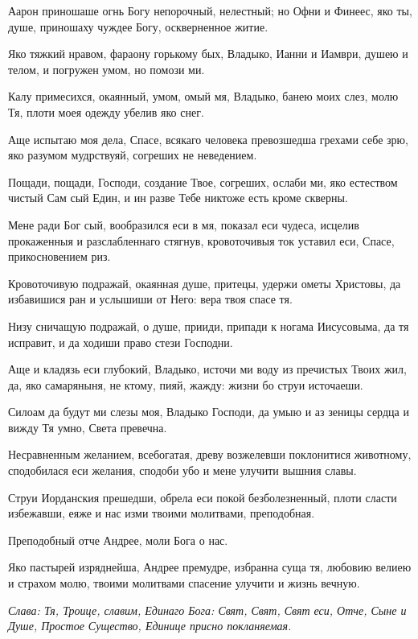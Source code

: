 Аарон приношаше огнь Богу непорочный, нелестный; но Офни и Финеес, яко ты, душе, приношаху чуждее Богу, оскверненное житие.


Яко тяжкий нравом, фараону горькому бых, Владыко, Ианни и Иамври, душею и телом, и погружен умом, но помози ми.


Калу примесихся, окаянный, умом, омый мя, Владыко, банею моих слез, молю Тя, плоти моея одежду убелив яко снег.


Аще испытаю моя дела, Спасе, всякаго человека превозшедша грехами себе зрю, яко разумом мудрствуяй, согреших не неведением.


Пощади, пощади, Господи, создание Твое, согреших, ослаби ми, яко естеством чистый Сам сый Един, и ин разве Тебе никтоже есть кроме скверны.


Мене ради Бог сый, вообразился еси в мя, показал еси чудеса, исцелив прокаженныя и разслабленнаго стягнув, кровоточивыя ток уставил еси, Спасе, прикосновением риз.


Кровоточивую подражай, окаянная душе, притецы, удержи ометы Христовы, да избавишися ран и услышиши от Него: вера твоя спасе тя.


Низу сничащую подражай, о душе, прииди, припади к ногама Иисусовыма, да тя исправит, и да ходиши право стези Господни.


Аще и кладязь еси глубокий, Владыко, источи ми воду из пречистых Твоих жил, да, яко самаряныня, не ктому, пияй, жажду: жизни бо струи источаеши.


Силоам да будут ми слезы моя, Владыко Господи, да умыю и аз зеницы сердца и вижду Тя умно, Света превечна.




Несравненным желанием, всебогатая, древу возжелевши поклонитися животному, сподобилася еси желания, сподоби убо и мене улучити вышния славы.




Струи Иорданския прешедши, обрела еси покой безболезненный, плоти сласти избежавши, еяже и нас изми твоими молитвами, преподобная.


Преподобный отче Андрее, моли Бога о нас.


Яко пастырей изряднейша, Андрее премудре, избранна суща тя, любовию велиею и страхом молю, твоими молитвами спасение улучити и жизнь вечную.


\itshape Слава\normalfont{}: Тя, Троице, славим, Единаго Бога: Свят, Свят, Свят еси, Отче, Сыне и Душе, Простое Существо, Единице присно покланяемая.


